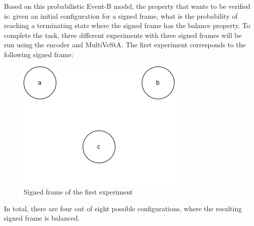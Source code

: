 Based on this probabilistic Event-B model, the property that wants to be verified is: given an initial configuration for a signed frame, what is the probability of reaching a terminating state where the signed frame has the balance property. To complete the task, three different experiments with three signed frames will be run using the encoder and MultiVeStA. The first experiment corresponds to the following signed frame:
\begin{figure}[H]
    \centering
    \includegraphics[scale=0.5]{images/CS13.png}
    \caption{Signed frame of the first experiment}
    \label{fig:CS13}
\end{figure}
In total, there are four out of eight possible configurations, where the resulting signed frame is balanced.
